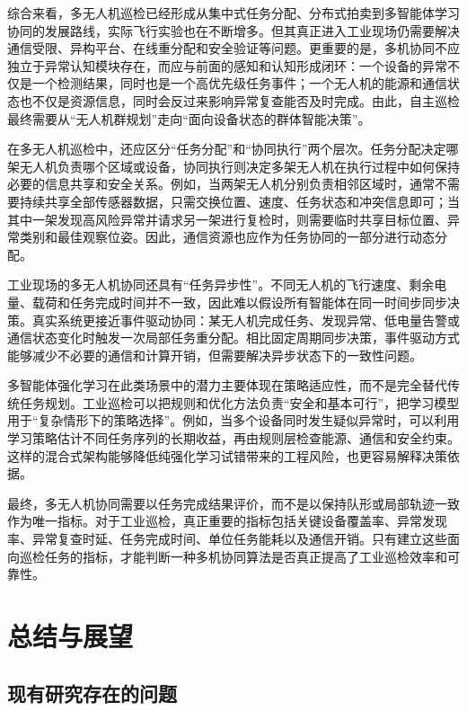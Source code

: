 综合来看，多无人机巡检已经形成从集中式任务分配、分布式拍卖到多智能体学习协同的发展路线，实际飞行实验也在不断增多。但其真正进入工业现场仍需要解决通信受限、异构平台、在线重分配和安全验证等问题。更重要的是，多机协同不应独立于异常认知模块存在，而应与前面的感知和认知形成闭环：一个设备的异常不仅是一个检测结果，同时也是一个高优先级任务事件；一个无人机的能源和通信状态也不仅是资源信息，同时会反过来影响异常复查能否及时完成。由此，自主巡检最终需要从“无人机群规划”走向“面向设备状态的群体智能决策”。



在多无人机巡检中，还应区分“任务分配”和“协同执行”两个层次。任务分配决定哪架无人机负责哪个区域或设备，协同执行则决定多架无人机在执行过程中如何保持必要的信息共享和安全关系。例如，当两架无人机分别负责相邻区域时，通常不需要持续共享全部传感器数据，只需交换位置、速度、任务状态和冲突信息即可；当其中一架发现高风险异常并请求另一架进行复检时，则需要临时共享目标位置、异常类别和最佳观察位姿。因此，通信资源也应作为任务协同的一部分进行动态分配。

工业现场的多无人机协同还具有“任务异步性”。不同无人机的飞行速度、剩余电量、载荷和任务完成时间并不一致，因此难以假设所有智能体在同一时间步同步决策。真实系统更接近事件驱动协同：某无人机完成任务、发现异常、低电量告警或通信状态变化时触发一次局部任务重分配。相比固定周期同步决策，事件驱动方式能够减少不必要的通信和计算开销，但需要解决异步状态下的一致性问题。

多智能体强化学习在此类场景中的潜力主要体现在策略适应性，而不是完全替代传统任务规划。工业巡检可以把规则和优化方法负责“安全和基本可行”，把学习模型用于“复杂情形下的策略选择”。例如，当多个设备同时发生疑似异常时，可以利用学习策略估计不同任务序列的长期收益，再由规则层检查能源、通信和安全约束。这样的混合式架构能够降低纯强化学习试错带来的工程风险，也更容易解释决策依据。

最终，多无人机协同需要以任务完成结果评价，而不是以保持队形或局部轨迹一致作为唯一指标。对于工业巡检，真正重要的指标包括关键设备覆盖率、异常发现率、异常复查时延、任务完成时间、单位任务能耗以及通信开销。只有建立这些面向巡检任务的指标，才能判断一种多机协同算法是否真正提高了工业巡检效率和可靠性。

\section{总结与展望}

\subsection{现有研究存在的问题}

